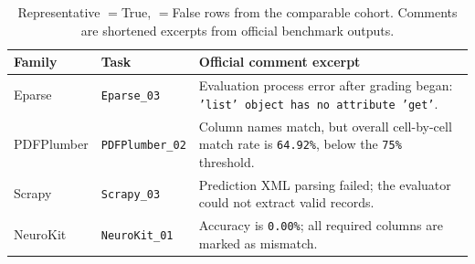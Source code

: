 \begin{table}[t]
\caption{Representative \processmetric$=$True, \resultmetric$=$False rows from the comparable cohort. Comments are shortened excerpts from official benchmark outputs.}
\label{tab:process-gap-examples}
\centering
\small
\begin{tabular}{p{}p{}p{}}
\toprule
\rowcolor{cyan!12}
Family & Task & Official comment excerpt \\
\midrule
\rowcolors{2}{cyan!4}{white}
Eparse & \texttt{Eparse\_03} & Evaluation process error after grading began: \texttt{'list' object has no attribute 'get'}. \\
PDFPlumber & \texttt{PDFPlumber\_02} & Column names match, but overall cell-by-cell match rate is \texttt{64.92\%}, below the \texttt{75\%} threshold. \\
Scrapy & \texttt{Scrapy\_03} & Prediction XML parsing failed; the evaluator could not extract valid records. \\
NeuroKit & \texttt{NeuroKit\_01} & Accuracy is \texttt{0.00\%}; all required columns are marked as mismatch. \\
\bottomrule
\end{tabular}
\end{table}
